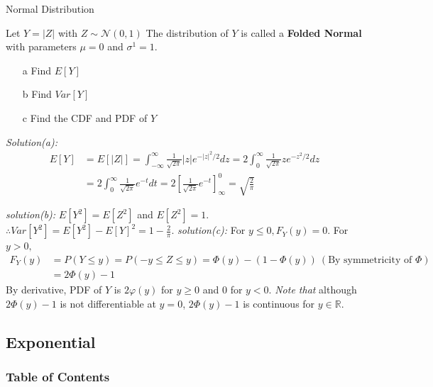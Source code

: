 \documentclass[8pt]{beamer}
\begin{document}
\begin{frame}{Normal Distribution}
    \begin{example}
        Let $Y = \vert Z \vert$ with $Z \sim \mathcal{N}(0,1)$ The distribution of $Y$ is called a \textbf{Folded Normal} with parameters $\mu=0$ and $\sigma^1=1$.

        \begin{enumerate}
            \item[a] Find $E[Y]$
            \item[b] Find $Var[Y]$
            \item[c] Find the CDF and PDF of $Y$ 
        \end{enumerate}

        \textit{Solution(a):} \[
        \begin{aligned}
            E[Y] &= E[\vert Z \vert] = \int_{-\infty}^\infty \frac{1}{\sqrt{2\pi}} \vert z \vert e^{- {\vert z\vert}^2/2} dz = 2 \int_0^\infty \frac{1}{\sqrt{2\pi}}z e^{-z^2 /2}dz \\ &= 2\int_0^\infty \frac{1}{\sqrt{2\pi}} e^{-t} dt
            = 2\left[ \frac{1}{\sqrt{2\pi}} e^{-t} \right]_\infty^0 = \sqrt{\frac{2}{\pi}}
        \end{aligned}
        \]

        \textit{solution(b):} $E[Y^2] = E[Z^2]$ and $E[Z^2] = 1$.
        $\therefore Var[Y^2] = E[Y^2] - E[Y]^2 = 1 - \frac{2}{\pi}$.
        \textit{solution(c):} For $y \leq 0, F_Y(y) = 0$. For $y >0,$
        \[\begin{aligned}
            F_Y(y) &= P(Y \leq y) = P(-y \leq Z  \leq y) = \Phi(y) - (1 - \Phi(y))\ (\text{By symmetricity of } \Phi) \\
            &= 2\Phi(y) -1\
        \end{aligned}
        \]
        By derivative, PDF of $Y$ is $2\varphi(y)$ for $y\geq 0$ and $0$ for $y < 0$. \textit{Note that} although $2\Phi(y) -1$ is not differentiable at $y=0$, $2\Phi(y) -1$ is continuous for $y \in \mathbb{R}$.
    \end{example}
\end{frame}


\subsection{Exponential}

\begin{frame}
    \frametitle{Table of Contents}
    \tableofcontents[currentsubsection]
\end{frame}
\end{document}
